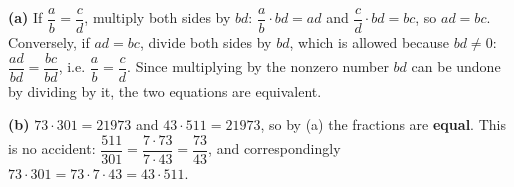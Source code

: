\textbf{(a)} If $\dfrac {a}{b}=\dfrac {c}{d}$, multiply both sides by $bd$: $\dfrac {a}{b}\cdot bd=ad$ and $\dfrac {c}{d}\cdot bd=bc$, so $ad=bc$. Conversely, if $ad=bc$, divide both sides by $bd$, which is allowed because $bd\ne0$: $\dfrac{ad}{bd}=\dfrac{bc}{bd}$, i.e. $\dfrac {a}{b}=\dfrac {c}{d}$. Since multiplying by the nonzero number $bd$ can be undone by dividing by it, the two equations are equivalent.

\textbf{(b)} $73\cdot301=21973$ and $43\cdot511=21973$, so by (a) the fractions are \textbf{equal}. This is no accident: $\dfrac{511}{301}=\dfrac{7\cdot73}{7\cdot43}=\dfrac{73}{43}$, and correspondingly $73\cdot301=73\cdot7\cdot43=43\cdot511$.
